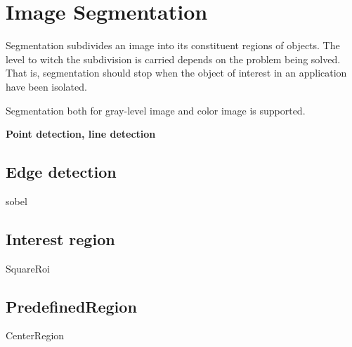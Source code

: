 \section{Image Segmentation}
Segmentation subdivides an image into its constituent regions of objects. The level to witch the subdivision is carried depends on the problem being solved. That is, segmentation should stop when the object of interest in an application have been isolated.

Segmentation both for gray-level image and color image is supported.

{\bf Point detection, line detection}

\subsection{Edge detection}
sobel

\subsection{Interest region}
SquareRoi

\subsection{PredefinedRegion}
CenterRegion

